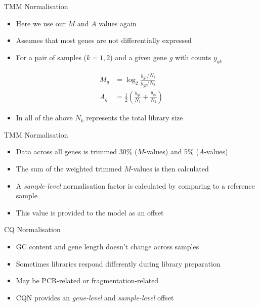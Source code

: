 \documentclass[aspectratio=169,11pt]{beamer}
\begin{document}
\begin{frame}{TMM Normalisation}

	\begin{itemize}
		\item Here we use our $M$ and $A$ values again
		\item Assumes that most genes are not differentially expressed
		\item For a pair of samples ($k=1,2$) and a given gene $g$ with counts $y_{gk}$
	\end{itemize}
	\begin{align*}
		M_g &= \log_2 \frac{y_{g1} / N_1}{y_{g2} / N_2}\\[2mm]
		A_g &= \frac{1}{2} \left(\frac{y_{g1}}{N_1} + \frac{y_{g2}}{N_2} \right)
	\end{align*}
	\begin{itemize}
		\item In all of the above $N_k$ represents the total library size
	\end{itemize}

\end{frame}

\begin{frame}{TMM Normalisation}

	\begin{itemize}
		\item Data across all genes is trimmed 30\% ($M$-values) and 5\% ($A$-values)
		\item The sum of the weighted trimmed $M$-values is then calculated
		\item A \textit{sample-level} normalisation factor is calculated by comparing to a reference sample
		\item This value is provided to the model as an offset
	\end{itemize}

\end{frame}

\begin{frame}{CQ Normalisation}

	\begin{itemize}
		\item GC content and gene length doesn't change across samples
		\item Sometimes libraries respond differently during library preparation
		\item May be PCR-related or fragmentation-related
		\item CQN provides an \textit{gene-level} and \textit{sample-level} offset
	\end{itemize}

\end{frame}
\end{document}
